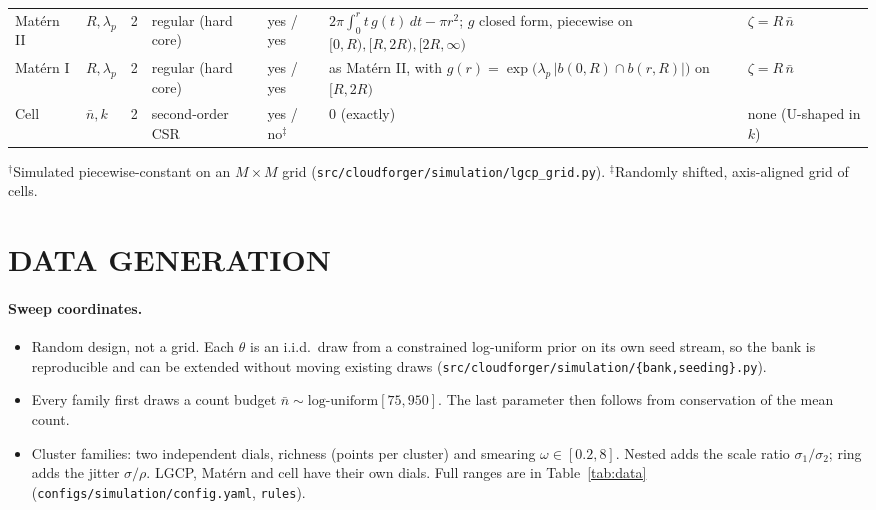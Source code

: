 \documentclass[twoside]{article}
\newcommand{\src}[1]{{\footnotesize\texttt{#1}}}
\newcommand{\nb}{\bar n}
\begin{document}
\begin{table}[t]
\begin{center}
\begin{tabular}{@{}lllll p{5.4cm} l@{}}
Mat\'ern II  & $R,\lambda_p$ & 2 & regular (hard core) & yes / yes &
  $2\pi\int_0^r t\,g(t)\,dt-\pi r^2$; $g$ closed form, piecewise on $[0,R),[R,2R),[2R,\infty)$ & $\zeta=R\,\nb$ \\
Mat\'ern I   & $R,\lambda_p$ & 2 & regular (hard core) & yes / yes &
  as Mat\'ern II, with $g(r)=\exp\bigl(\lambda_p\,|b(0,R)\cap b(r,R)|\bigr)$ on $[R,2R)$ & $\zeta=R\,\nb$ \\
Cell         & $\nb,k$ & 2 & second-order CSR & yes / no$^\ddagger$ & $0$ (exactly) & none (U-shaped in $k$) \\
\bottomrule
\end{tabular}
\end{center}
{\footnotesize $^\dagger$Simulated piecewise-constant on an $M\times M$ grid (\src{src/cloudforger/simulation/lgcp\_grid.py}).
$^\ddagger$Randomly shifted, axis-aligned grid of cells.}
\end{table}

\section{DATA GENERATION}

\paragraph{Sweep coordinates.}
\begin{itemize}
  \item Random design, not a grid. Each $\theta$ is an i.i.d.\ draw from a constrained log-uniform prior on its own
        seed stream, so the bank is reproducible and can be extended without moving existing draws
        (\src{src/cloudforger/simulation/\{bank,seeding\}.py}).
  \item Every family first draws a count budget $\nb\sim\text{log-uniform}[75,950]$. The last parameter then
        follows from conservation of the mean count.
  \item Cluster families: two independent dials, richness (points per cluster) and smearing $\omega\in[0.2,8]$.
        Nested adds the scale ratio $\sigma_1/\sigma_2$; ring adds the jitter $\sigma/\rho$. LGCP, Mat\'ern and cell
        have their own dials. Full ranges are in Table~\ref{tab:data}
        (\src{configs/simulation/config.yaml}, \texttt{rules}).
\end{itemize}
\end{document}
